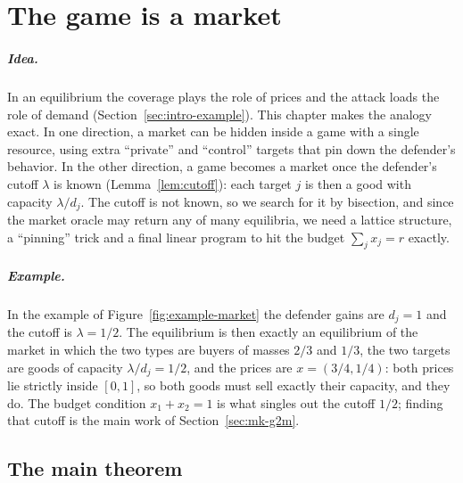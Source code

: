 \chapter{The game is a market}\label{ch:market}
\providecommand{\Xlo}{\underline{X}}\providecommand{\Xhi}{\overline{X}}

\paragraph{Idea.} In an equilibrium the coverage plays the role of prices and the attack loads the role
of demand (Section~\ref{sec:intro-example}). This chapter makes the analogy exact. In one direction, a
market can be hidden inside a game with a single resource, using extra ``private'' and ``control''
targets that pin down the defender's behavior. In the other direction, a game becomes a market once the
defender's cutoff $\lambda$ is known (Lemma~\ref{lem:cutoff}): each target $j$ is then a good with
capacity $\lambda/d_j$. The cutoff is not known, so we search for it by bisection, and since the market
oracle may return any of many equilibria, we need a lattice structure, a ``pinning'' trick and a final
linear program to hit the budget $\sum_jx_j=r$ exactly.

\paragraph{Example.} In the example of Figure~\ref{fig:example-market} the defender gains are $d_j=1$
and the cutoff is $\lambda=1/2$. The equilibrium is then exactly an equilibrium of the market in which
the two types are buyers of masses $2/3$ and $1/3$, the two targets are goods of capacity
$\lambda/d_j=1/2$, and the prices are $x=(3/4,1/4)$: both prices lie strictly inside $[0,1]$, so both
goods must sell exactly their capacity, and they do. The budget condition $x_1+x_2=1$ is what singles
out the cutoff $1/2$; finding that cutoff is the main work of Section~\ref{sec:mk-g2m}.

\section{The main theorem}

